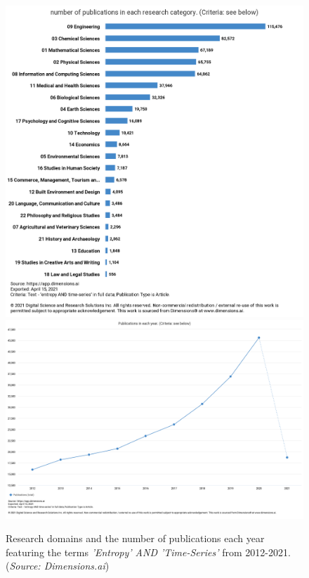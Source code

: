 \documentclass[12pt, a4paper, titlepage, openany]{book}
\begin{document}
\vspace{5mm}
\begin{figure}[!ht]
    \centering
	\includegraphics[scale=.175]{Preface2.png}
	\includegraphics[scale=.15]{Preface1.png}
    \caption{Research domains and the number of publications each year featuring the terms \emph{'Entropy' AND 'Time-Series'} from 2012-2021. (\textit{Source: Dimensions.ai})}
    \label{fig:fig_1}

\end{figure}
\end{document}
